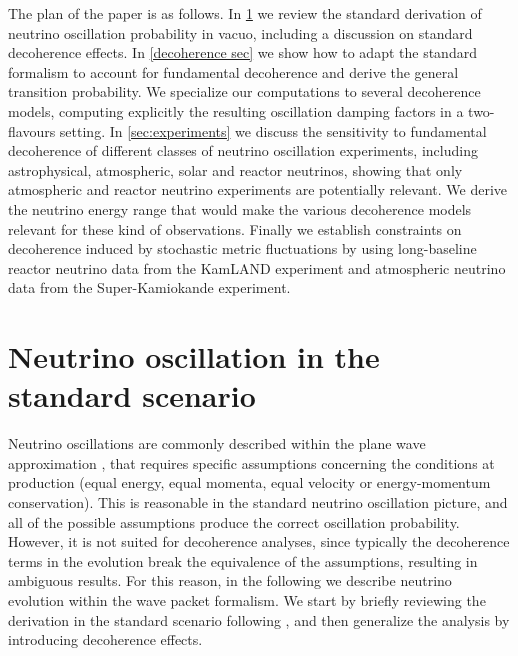 \documentclass[11pt]{article}
\begin{document}
The plan of the paper is as follows. In \cref{standard oscillations section} we review the standard derivation of neutrino oscillation probability in vacuo, including a discussion on standard decoherence effects. In \cref{decoherence sec} we show how to adapt the standard formalism to account for fundamental decoherence and derive the general transition probability. We specialize our computations to several decoherence models, computing explicitly the resulting oscillation damping factors in a two-flavours setting. In \cref{sec:experiments}
we discuss the sensitivity to fundamental decoherence of different classes of neutrino oscillation experiments, including astrophysical, atmospheric, solar and reactor neutrinos, showing that only atmospheric and reactor neutrino experiments are potentially relevant. We derive the neutrino energy range that would make the various decoherence models relevant for these kind of observations. Finally we establish constraints on decoherence induced by stochastic metric fluctuations by using long-baseline reactor neutrino data from the KamLAND experiment and atmospheric neutrino data from the Super-Kamiokande experiment.




\section{Neutrino oscillation in the standard scenario}\label{standard oscillations section}

Neutrino oscillations are commonly described within the plane wave approximation \cite{Akhmedov:2009rb}, that requires specific assumptions concerning the conditions at production (equal energy, equal momenta, equal velocity or energy-momentum conservation). This is reasonable in the standard neutrino oscillation picture, and all of the possible assumptions produce the correct oscillation probability. However, it is not suited for decoherence analyses, since typically the decoherence terms in the evolution break the equivalence of the assumptions, resulting in ambiguous results. For this reason, in the following we describe neutrino evolution within the wave packet formalism. We start by briefly reviewing the derivation in the standard scenario following \cite{Akhmedov:2009rb}, and then generalize the analysis by introducing decoherence effects.
\end{document}
